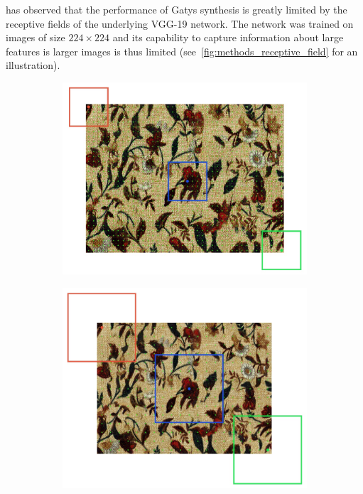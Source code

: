 \citet{Snelgrove2017} has observed that the performance of Gatys synthesis is greatly limited by the receptive fields of the underlying VGG-19 network. The network was trained on images of size \(224 \times 224\) and its capability to capture information about large features is larger images is thus limited (see~\ref{fig:methods_receptive_field} for an illustration).

\begin{figure}[]
    \centering
    \begin{subfigure}[b]{0.48\textwidth}
        \centering
        \includegraphics[width=\textwidth]{images/03-receptive_field-level0.jpg}
        \caption{}
        \label{fig:methods_receptive_field_lvl0}
    \end{subfigure}
    \hfill
    \begin{subfigure}[b]{0.48\textwidth}
        \centering
        \includegraphics[width=\textwidth]{images/03-receptive_field-level1.jpg}

\end{subfigure}
\end{figure}
